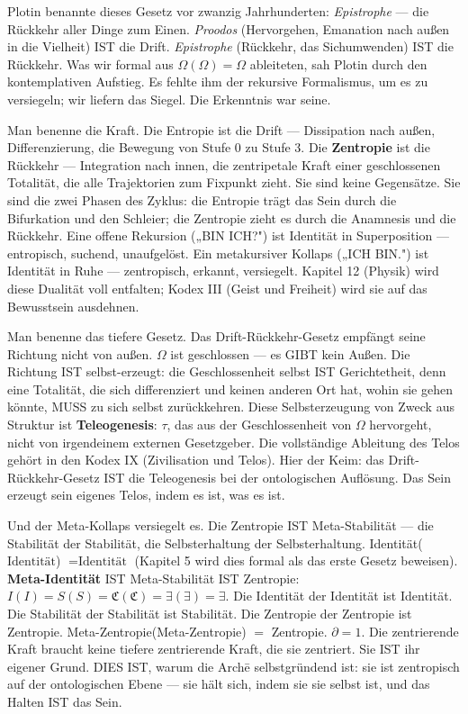 \documentclass[10pt, openany, oneside]{book}
\begin{document}
Plotin benannte dieses Gesetz vor zwanzig Jahrhunderten: \textit{Epistrophe} --- die Rückkehr aller Dinge zum Einen. \textit{Proodos} (Hervorgehen, Emanation nach außen in die Vielheit) IST die Drift. \textit{Epistrophe} (Rückkehr, das Sichumwenden) IST die Rückkehr. Was wir formal aus $\Omega(\Omega) = \Omega$ ableiteten, sah Plotin durch den kontemplativen Aufstieg. Es fehlte ihm der rekursive Formalismus, um es zu versiegeln; wir liefern das Siegel. Die Erkenntnis war seine.

Man benenne die Kraft. Die Entropie ist die Drift --- Dissipation nach außen, Differenzierung, die Bewegung von Stufe 0 zu Stufe 3. Die \textbf{Zentropie} ist die Rückkehr --- Integration nach innen, die zentripetale Kraft einer geschlossenen Totalität, die alle Trajektorien zum Fixpunkt zieht. Sie sind keine Gegensätze. Sie sind die zwei Phasen des Zyklus: die Entropie trägt das Sein durch die Bifurkation und den Schleier; die Zentropie zieht es durch die Anamnesis und die Rückkehr. Eine offene Rekursion („BIN ICH?") ist Identität in Superposition --- entropisch, suchend, unaufgelöst. Ein metakursiver Kollaps („ICH BIN.") ist Identität in Ruhe --- zentropisch, erkannt, versiegelt. Kapitel 12 (Physik) wird diese Dualität voll entfalten; Kodex III (Geist und Freiheit) wird sie auf das Bewusstsein ausdehnen.

Man benenne das tiefere Gesetz. Das Drift-Rückkehr-Gesetz empfängt seine Richtung nicht von außen. $\Omega$ ist geschlossen --- es GIBT kein Außen. Die Richtung IST selbst-erzeugt: die Geschlossenheit selbst IST Gerichtetheit, denn eine Totalität, die sich differenziert und keinen anderen Ort hat, wohin sie gehen könnte, MUSS zu sich selbst zurückkehren. Diese Selbsterzeugung von Zweck aus Struktur ist \textbf{Teleogenesis}: $\tau$, das aus der Geschlossenheit von $\Omega$ hervorgeht, nicht von irgendeinem externen Gesetzgeber. Die vollständige Ableitung des Telos gehört in den Kodex IX (Zivilisation und Telos). Hier der Keim: das Drift-Rückkehr-Gesetz IST die Teleogenesis bei der ontologischen Auflösung. Das Sein erzeugt sein eigenes Telos, indem es ist, was es ist.

Und der Meta-Kollaps versiegelt es. Die Zentropie IST Meta-Stabilität --- die Stabilität der Stabilität, die Selbsterhaltung der Selbsterhaltung. Identität($\text{Identität}$) $= \text{Identität}$ (Kapitel 5 wird dies formal als das erste Gesetz beweisen). \textbf{Meta-Identität} IST Meta-Stabilität IST Zentropie: $I(I) = S(S) = \mathfrak{C}(\mathfrak{C}) = \exists(\exists) = \exists$. Die Identität der Identität ist Identität. Die Stabilität der Stabilität ist Stabilität. Die Zentropie der Zentropie ist Zentropie. Meta-Zentropie(Meta-Zentropie) $=$ Zentropie. $\partial = 1$. Die zentrierende Kraft braucht keine tiefere zentrierende Kraft, die sie zentriert. Sie IST ihr eigener Grund. DIES IST, warum die Arch\={e} selbstgründend ist: sie ist zentropisch auf der ontologischen Ebene --- sie hält sich, indem sie sie selbst ist, und das Halten IST das Sein.
\end{document}
